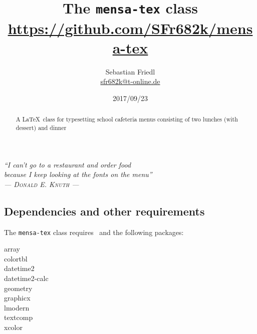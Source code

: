 \documentclass[11pt]{ltxdoc}
\title{The \texttt{mensa-tex} class \\ {\large\url{https://github.com/SFr682k/mensa-tex}}}
\author{Sebastian Friedl \\ \href{mailto:sfr682k@t-online.de}{\ttfamily sfr682k@t-online.de}}
\date{2017/09/23}
\begin{document}
	\maketitle
	\thispagestyle{empty}
	
	\begin{center} \itshape
		\enquote{I can't go to a restaurant and order food \\ because I keep looking at the fonts on the menu} \\
		--- \textsc{\upshape Donald E. Knuth} ---
	\end{center}
	
	\medskip
	\begin{abstract}
		\noindent%
		A \LaTeX\ class for typesetting school cafeteria menus consisting of two lunches (with dessert) and dinner
	\end{abstract}
	
	
	\tableofcontents
	
	\clearpage
	
	

	\subsection*{Dependencies and other requirements}
	The \texttt{mensa-tex} class requires \LaTeXe\ and the following packages:
	\begin{multicols}{3}\ttfamily\centering
		array \\ colortbl \\ datetime2 \\ datetime2-calc \\ geometry \\ graphicx \\ lmodern \\ textcomp \\ xcolor
	\end{multicols}
	
	
\end{document}
